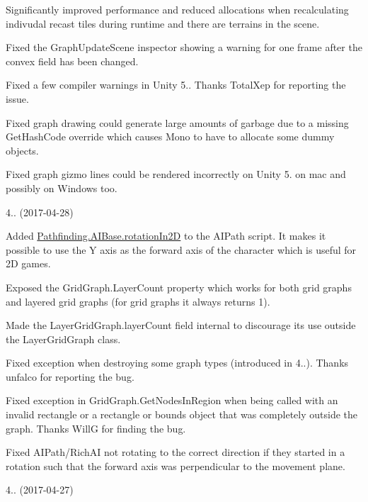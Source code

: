 \begin{DoxyItemize}
\begin{DoxyItemize}
\item Significantly improved performance and reduced allocations when recalculating indivudal recast tiles during runtime and there are terrains in the scene.
\item Fixed the Graph\+Update\+Scene inspector showing a warning for one frame after the \textquotesingle{}convex\textquotesingle{} field has been changed.
\item Fixed a few compiler warnings in Unity 5.. Thanks Total\+Xep for reporting the issue.
\item Fixed graph drawing could generate large amounts of garbage due to a missing Get\+Hash\+Code override which causes Mono to have to allocate some dummy objects.
\item Fixed graph gizmo lines could be rendered incorrectly on Unity 5. on mac and possibly on Windows too.
\end{DoxyItemize}
\item 4.. (2017-\/04-\/28)
\begin{DoxyItemize}
\item Added \mbox{\hyperlink{class_pathfinding_1_1_a_i_base_a3841d2c047e0f75d43fd95db3d0730fb}{Pathfinding.\+A\+I\+Base.\+rotation\+In2D}} to the A\+I\+Path script. It makes it possible to use the Y axis as the forward axis of the character which is useful for 2D games.
\item Exposed the Grid\+Graph.\+Layer\+Count property which works for both grid graphs and layered grid graphs (for grid graphs it always returns 1).
\item Made the Layer\+Grid\+Graph.\+layer\+Count field internal to discourage its use outside the Layer\+Grid\+Graph class.
\item Fixed exception when destroying some graph types (introduced in 4..). Thanks unfalco for reporting the bug.
\item Fixed exception in Grid\+Graph.\+Get\+Nodes\+In\+Region when being called with an invalid rectangle or a rectangle or bounds object that was completely outside the graph. Thanks WillG for finding the bug.
\item Fixed A\+I\+Path/\+Rich\+AI not rotating to the correct direction if they started in a rotation such that the forward axis was perpendicular to the movement plane.
\end{DoxyItemize}
\item 4.. (2017-\/04-\/27)
\begin{DoxyItemize}

\end{DoxyItemize}
\end{DoxyItemize}
